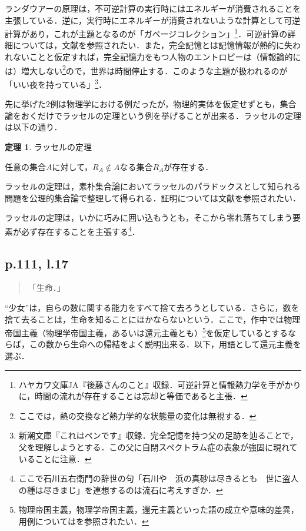 \documentclass[10pt, a5paper, twoside]{jsarticle}
\theoremstyle{definition}
\newtheorem{thm}{定理}
\begin{document}
			ランダウアーの原理は，不可逆計算の実行時にはエネルギーが消費されることを主張している．逆に，実行時にエネルギーが消費されないような計算として可逆計算があり，これが主題となるのが「ガベージコレクション」\footnote{ハヤカワ文庫JA『後藤さんのこと』収録．可逆計算と情報熱力学を手がかりに，時間の流れが存在することは忘却と等価であると主張．}．可逆計算の詳細については，文献\cite{kgk}を参照されたい．また，完全記憶とは記憶情報が熱的に失われないことと仮定すれば，完全記憶力をもつ人物のエントロピーは（情報論的には）増大しない\footnote{ここでは，熱の交換など熱力学的な状態量の変化は無視する．}ので，世界は時間停止する．このような主題が扱われるのが「いい夜を持っている」\footnote{新潮文庫『これはペンです』収録．完全記憶を持つ父の足跡を辿ることで，父を理解しようとする．この父に自閉スペクトラム症の表象が強固に現れていることに注意．}．

			先に挙げた2例は物理学における例だったが，物理的実体を仮定せずとも，集合論をおくだけでラッセルの定理という例を挙げることが出来る．ラッセルの定理は以下の通り．

			\begin{thm}

				ラッセルの定理

				任意の集合$A$に対して，$R_A \notin A$なる集合$R_A$が存在する．
				
			\end{thm}

			ラッセルの定理は，素朴集合論においてラッセルのパラドックスとして知られる問題を公理的集合論で整理して得られる．証明については文献\cite{russell}を参照されたい．

			ラッセルの定理は，いかに巧みに囲い込もうとも，そこから零れ落ちてしまう要素が必ず存在することを主張する\footnote{ここで石川五右衛門の辞世の句「石川や　浜の真砂は尽きるとも　世に盗人の種は尽きまじ」を連想するのは流石に考えすぎか．}．

		\subsection{p.111, l.17}

			\begin{quote}

				「生命．」
				
			\end{quote}

			“少女”は，自らの数に関する能力をすべて捨て去ろうとしている．さらに，数を捨て去ることは，生命を知ることにほかならないという．ここで，作中では物理帝国主義（物理学帝国主義，あるいは還元主義とも）\footnote{物理帝国主義，物理学帝国主義，還元主義といった語の成立や意味的差異，用例については\cite{isd}を参照されたい．}を仮定しているとするならば，この数から生命への帰結をよく説明出来る．以下，用語として還元主義を選ぶ．
\end{document}
